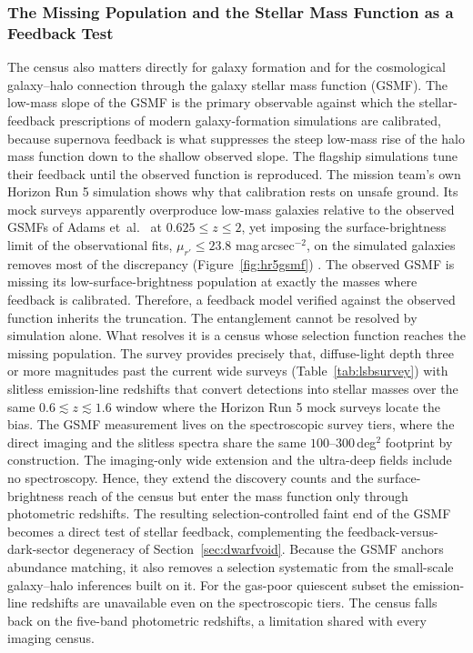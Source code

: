 \documentclass[10pt,onecolumn]{article}
\begin{document}
\subsubsection{The Missing Population and the Stellar Mass Function as a Feedback Test}

The census also matters directly for galaxy formation and for the cosmological galaxy--halo connection through the galaxy stellar mass function (GSMF). The low-mass slope of the GSMF is the primary observable against which the stellar-feedback prescriptions of modern galaxy-formation simulations are calibrated, because supernova feedback is what suppresses the steep low-mass rise of the halo mass function down to the shallow observed slope. The flagship simulations tune their feedback until the observed function is reproduced. The mission team's own Horizon Run 5 simulation shows why that calibration rests on unsafe ground. Its mock surveys apparently overproduce low-mass galaxies relative to the observed GSMFs of Adams et~al.\ \cite{adams2021} at $0.625\le z\le2$, yet imposing the surface-brightness limit of the observational fits, $\mu_{r'}\leq23.8$ mag\,arcsec$^{-2}$, on the simulated galaxies removes most of the discrepancy (Figure~\ref{fig:hr5gsmf}) \cite{kim2023gsmf}. The observed GSMF is missing its low-surface-brightness population at exactly the masses where feedback is calibrated. Therefore, a feedback model verified against the observed function inherits the truncation. The entanglement cannot be resolved by simulation alone. What resolves it is a census whose selection function reaches the missing population. The survey provides precisely that, diffuse-light depth three or more magnitudes past the current wide surveys (Table~\ref{tab:lsbsurvey}) with slitless emission-line redshifts that convert detections into stellar masses over the same $0.6\lesssim z\lesssim1.6$ window where the Horizon Run 5 mock surveys locate the bias. The GSMF measurement lives on the spectroscopic survey tiers, where the direct imaging and the slitless spectra share the same $100$--$300$\,deg$^2$ footprint by construction. The imaging-only wide extension and the ultra-deep fields include no spectroscopy. Hence, they extend the discovery counts and the surface-brightness reach of the census but enter the mass function only through photometric redshifts. The resulting selection-controlled faint end of the GSMF becomes a direct test of stellar feedback, complementing the feedback-versus-dark-sector degeneracy of Section~\ref{sec:dwarfvoid}. Because the GSMF anchors abundance matching, it also removes a selection systematic from the small-scale galaxy--halo inferences built on it. For the gas-poor quiescent subset the emission-line redshifts are unavailable even on the spectroscopic tiers. The census falls back on the five-band photometric redshifts, a limitation shared with every imaging census.
\end{document}
